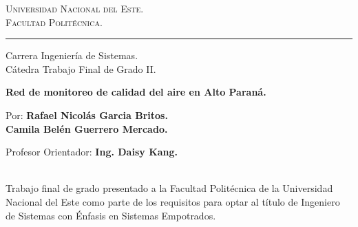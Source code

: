 \vspace*{-3cm}
\begin{figure}[h]
\leavevmode
\begin{minipage}{\textwidth}
\begin{center}
\end{center}
\end{minipage}
\end{figure}

\thispagestyle{empty}

{\bf
\begin{center}
\large
\vspace*{-1 cm}\Large \textsc{Universidad Nacional del Este.} \\
\Large \textsc{Facultad Politécnica.} \\
\vspace*{0.5 cm}\hrule
\vspace*{0.5 cm}\Large Carrera Ingeniería de Sistemas.\\
\vspace*{0 cm}\Large Cátedra Trabajo Final de Grado II.\\
\end{center}
}

\vspace{3.5 cm}
{
\noindent
\begin{center}
\huge \bf Red de monitoreo de calidad del aire en Alto Paraná.
\end{center}
}


\vspace{0.5 cm}
{ 

Por: \textbf{\Large Rafael Nicolás Garcia Britos.}\\[5mm]
\hspace*{1.5cm}\textbf{\Large Camila Belén Guerrero Mercado.}

\vspace*{.5 cm}
Profesor Orientador: \textbf{\large Ing. Daisy Kang.}
}%
\vspace*{0.5 cm}\\
Trabajo final de grado presentado a la Facultad Politécnica de la Universidad Nacional del Este como parte de los requisitos para optar al título de Ingeniero de Sistemas con Énfasis en Sistemas Empotrados.

